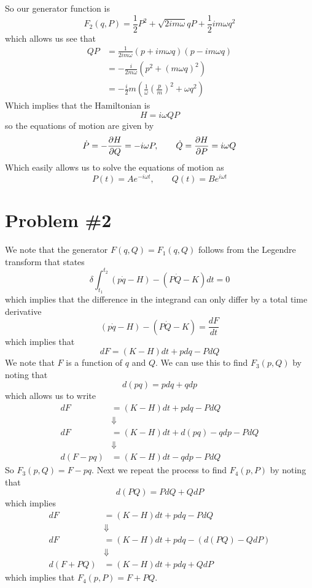 \documentclass[11pt]{article}
\numberwithin{equation}{section}
\begin{document}
So our generator function is
$$F_2(q,P) = \frac{1}{2}P^2 +\sqrt{2im\omega}{q}P + \frac{1}{2}im\omega{q^2}$$
which allows us see that
\begin{align*}
QP &= \frac{1}{2im\omega}(p+im\omega{q})(p-im\omega{q})\\
&= -\frac{i}{2m\omega}(p^2+(m\omega{q})^2)\\
&= -\frac{i}{2}m\left(\frac{1}{\omega}\left(\frac{p}{m}\right)^2+\omega{q}^2\right)
\end{align*}
Which implies that the Hamiltonian is 
$$H = i\omega{QP}$$
so the equations of motion are given by
$$\dot{P} = -\frac{\partial{H}}{\partial{Q}} = -i\omega{P},\qquad \dot{Q} = \frac{\partial{H}}{\partial{P}} = i\omega{Q}$$
Which easily allows us to solve the equations of motion as
$$P(t) = Ae^{-i\omega{t}},\qquad Q(t) = Be^{i\omega{t}}$$

\pagebreak

\section{Problem \#2}
We note that the generator $F(q,Q) = F_1(q,Q)$ follows from the Legendre transform that states
$$\delta\int_{t_1}^{t_2}(p\dot{q}-H)-(P\dot{Q}-K)dt = 0$$
which implies that the difference in the integrand can only differ by a total time derivative
$$(p\dot{q}-H)-(P\dot{Q}-K) = \frac{dF}{dt}$$
which implies that 
$$dF = (K-H)dt + pdq - PdQ$$
We note that $F$ is a function of $q$ and $Q$. We can use this to find $F_3(p,Q)$ by noting
that
$$d(pq) = pdq + qdp$$
which allows us to write
\begin{align*}
dF &= (K-H)dt + pdq - PdQ\\
&\Downarrow\\
dF &= (K-H)dt + d(pq) - qdp - PdQ\\
&\Downarrow\\
d(F-pq) &= (K-H)dt - qdp - PdQ
\end{align*}
So $F_3(p,Q) = F-pq$. Next we repeat the process to find $F_4(p,P)$ by noting that
$$d(PQ) = PdQ + QdP$$
which implies
\begin{align*}
dF &= (K-H)dt + pdq - PdQ\\
&\Downarrow\\
dF &= (K-H)dt + pdq - (d(PQ) - QdP)\\
&\Downarrow\\
d(F+PQ) &= (K-H)dt + pdq + QdP
\end{align*}
which implies that $F_4(p,P) = F+PQ$.

\pagebreak
\end{document}
